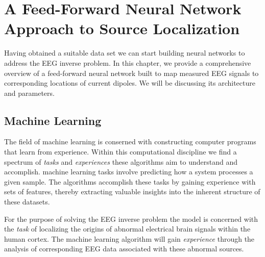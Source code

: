 \documentclass[a4paper, UKenglish, 11pt]{uiomaster}
\begin{document}
\chapter{A Feed-Forward Neural Network Approach to Source Localization}

Having obtained a suitable data set we can start building neural networks to address the EEG inverse problem. In this chapter, we provide a comprehensive overview of a feed-forward neural network built to map measured EEG signals to corresponding locations of current dipoles. We will be discussing its architecture and parameters.



%
%


\section{Machine Learning}
The field of machine learning is conserned with constructing computer programs that learn from experience. Within this computational discipline we find a spectrum of \emph{tasks} and \emph{experiences} these algorithms aim to understand and accomplish. machine learning tasks involve predicting how a system processes a given sample. The algorithms accomplish these tasks by gaining experience with sets of features, thereby extracting valuable insights into the inherent structure of these datasets.

For the purpose of solving the EEG inverse problem the model is concerned with the \emph{task} of localizing the origins of abnormal electrical brain signals within the human cortex. The machine learning algorithm will gain \emph{experience} through the analysis of corresponding EEG data associated with these abnormal sources.
\end{document}

